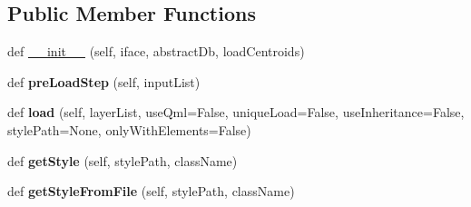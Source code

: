 \subsection*{Public Member Functions}
\begin{DoxyCompactItemize}
\item 
def \mbox{\hyperlink{class_dsg_tools_1_1_factories_1_1_layer_loader_factory_1_1edgv_layer_loader_1_1_e_d_g_v_layer_loader_a3178f2b62842e74feed9174f16fba2bb}{\+\_\+\+\_\+init\+\_\+\+\_\+}} (self, iface, abstract\+Db, load\+Centroids)
\item 
\mbox{\label{class_dsg_tools_1_1_factories_1_1_layer_loader_factory_1_1edgv_layer_loader_1_1_e_d_g_v_layer_loader_a2c2bb53380675c96a273e43eab744657}} 
def {\bfseries pre\+Load\+Step} (self, input\+List)
\item 
\mbox{\label{class_dsg_tools_1_1_factories_1_1_layer_loader_factory_1_1edgv_layer_loader_1_1_e_d_g_v_layer_loader_a88e5087dd8ca9f2ba9ad72b5bb16dd33}} 
def {\bfseries load} (self, layer\+List, use\+Qml=False, unique\+Load=False, use\+Inheritance=False, style\+Path=None, only\+With\+Elements=False)
\item 
\mbox{\label{class_dsg_tools_1_1_factories_1_1_layer_loader_factory_1_1edgv_layer_loader_1_1_e_d_g_v_layer_loader_a781615fa33e8b731d6d6d6b1b729eece}} 
def {\bfseries get\+Style} (self, style\+Path, class\+Name)
\item 
\mbox{\label{class_dsg_tools_1_1_factories_1_1_layer_loader_factory_1_1edgv_layer_loader_1_1_e_d_g_v_layer_loader_aaf0416dfe2368c02e54041a2f1ff4f4f}} 
def {\bfseries get\+Style\+From\+File} (self, style\+Path, class\+Name)
\item 
\mbox{\label{class_dsg_tools_1_1_factories_1_1_layer_loader_factory_1_1edgv_layer_loader_1_1_e_d_g_v_layer_loader_a73f900d55bb1b834b2245b41606c9399}} 

\end{DoxyCompactItemize}
